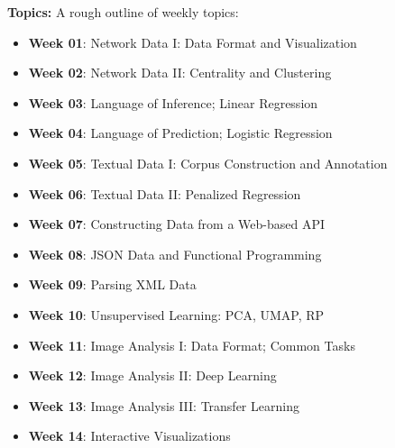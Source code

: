 \documentclass[11pt, a4paper]{article}
\begin{document}
\bigskip

\textbf{Topics:}
A rough outline of weekly topics:

\begin{itemize} \setlength\itemsep{0em}
\item \textbf{Week 01}: Network Data I: Data Format and Visualization
\item \textbf{Week 02}: Network Data II: Centrality and Clustering
\item \textbf{Week 03}: Language of Inference; Linear Regression
\item \textbf{Week 04}: Language of Prediction; Logistic Regression
\item \textbf{Week 05}: Textual Data I: Corpus Construction and Annotation
\item \textbf{Week 06}: Textual Data II: Penalized Regression
\item \textbf{Week 07}: Constructing Data from a Web-based API
\item \textbf{Week 08}: JSON Data and Functional Programming
\item \textbf{Week 09}: Parsing XML Data
\item \textbf{Week 10}: Unsupervised Learning: PCA, UMAP, RP
\item \textbf{Week 11}: Image Analysis I: Data Format; Common Tasks
\item \textbf{Week 12}: Image Analysis II: Deep Learning 
\item \textbf{Week 13}: Image Analysis III: Transfer Learning
\item \textbf{Week 14}: Interactive Visualizations
\end{itemize}
\end{document}
